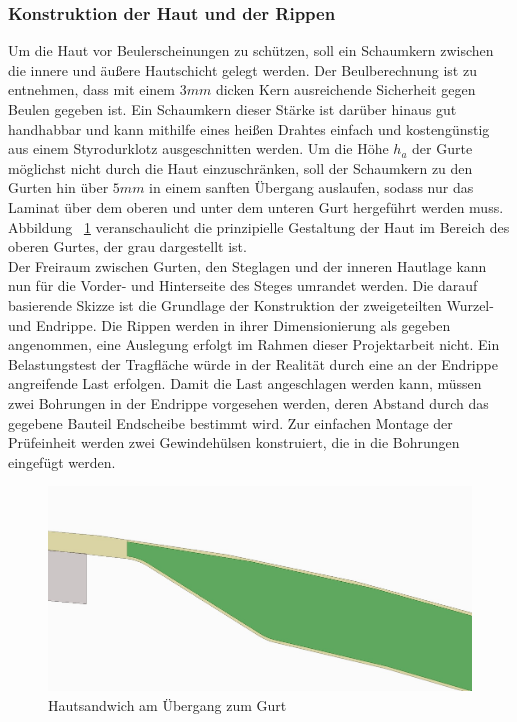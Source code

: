 \subsubsection{Konstruktion der Haut und der Rippen}
Um die Haut vor Beulerscheinungen zu schützen, soll ein Schaumkern zwischen die innere und äußere Hautschicht gelegt werden. Der Beulberechnung ist zu entnehmen, dass mit einem $ 3mm $ dicken Kern ausreichende Sicherheit gegen Beulen gegeben ist. Ein Schaumkern dieser Stärke ist darüber hinaus gut handhabbar und kann mithilfe eines heißen Drahtes einfach und kostengünstig aus einem Styrodurklotz ausgeschnitten werden. Um die Höhe $ h_{a} $ der Gurte möglichst nicht durch die Haut einzuschränken, soll der Schaumkern zu den Gurten hin über $ 5mm $ in einem sanften Übergang auslaufen, sodass nur das Laminat über dem oberen und unter dem unteren Gurt hergeführt werden muss. Abbildung ~\ref{fig: Hautuebergang} veranschaulicht die prinzipielle Gestaltung der Haut im Bereich des oberen Gurtes, der grau dargestellt ist. \\

\noindent Der Freiraum zwischen Gurten, den Steglagen und der inneren Hautlage kann nun für die Vorder- und Hinterseite des Steges umrandet werden. Die darauf basierende Skizze ist die Grundlage der Konstruktion der zweigeteilten Wurzel- und Endrippe. Die Rippen werden in ihrer Dimensionierung als gegeben angenommen, eine Auslegung erfolgt im Rahmen dieser Projektarbeit nicht. Ein Belastungstest der Tragfläche würde in der Realität durch eine an der Endrippe angreifende Last erfolgen. Damit die Last angeschlagen werden kann, müssen zwei Bohrungen in der Endrippe vorgesehen werden, deren Abstand durch das gegebene Bauteil Endscheibe bestimmt wird. Zur einfachen Montage der Prüfeinheit werden zwei Gewindehülsen konstruiert, die in die Bohrungen eingefügt werden.

\begin{figure}[h]
	\includegraphics[width=1.0\textwidth]{Bilder/Hautuebergang.jpg}
	\caption{Hautsandwich am Übergang zum Gurt}
	\label{fig: Hautuebergang}
\end{figure}

